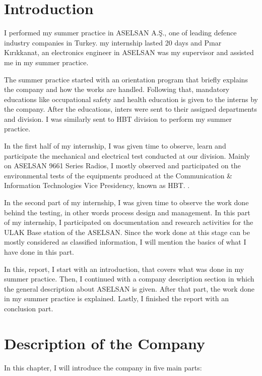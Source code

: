 \blankpage



\tableofcontents
\newpage



\section{Introduction}
\-\indent 
	I performed my summer practice in ASELSAN A.Ş., one of leading defence industry companies in Turkey. my internship lasted 20 days and Pınar Kırıkkanat, an electronics engineer in ASELSAN was my supervisor and assisted me in my summer practice.

	The summer practice started with an orientation program that briefly explains the company and how the works are handled. Following that, mandatory educations like occupational safety and health education is given to the interns by the company. After the educations, inters were sent to their assigned departments and division. I was similarly sent to HBT division to perform my summer practice.
	
	In the first half of my internship, I was given time to observe, learn and participate the mechanical and electrical test conducted at our division. Mainly on ASELSAN 9661 Series Radios, I mostly observed and participated on the environmental tests of the equipments produced at the Communication \& Information Technologies Vice Presidency, known as HBT. .
	
	In the second part of my internship, I was given time to observe the work done behind the testing, in other words process design and management. In this part of my internship, I participated on documentation and research activities for the ULAK Base station of the ASELSAN. Since the work done at this stage can be mostly considered as classified information, I will mention the basics of what I have done in this part.
	
	In this, report, I start with an introduction, that covers what was done in my summer practice. Then, I continued with a company description section in which the general description about ASELSAN is given. After that part, the work done in my summer practice is explained. Lastly, I finished the report with an conclusion part. 
	
	
 

\section{Description of the Company}
\- \indent
	In this chapter, I will introduce the company in five main parts:



